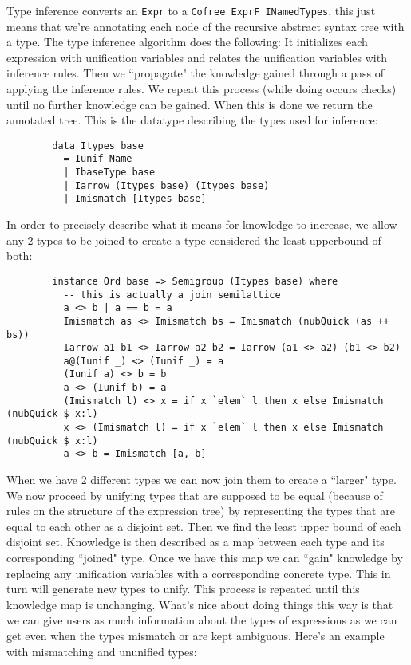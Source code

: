 \documentclass{article} %
\begin{document}
    Type inference converts an \texttt{Expr} to a \texttt{Cofree ExprF INamedTypes}, this just means that we're annotating each node of the recursive abstract syntax tree with a type. The type inference algorithm does the following: It initializes each expression with unification variables and relates the unification variables with inference rules. Then we ``propagate" the knowledge gained through a pass of applying the inference rules. We repeat this process (while doing occurs checks) until no further knowledge can be gained. When this is done we return the annotated tree. This is the datatype describing the types used for inference:
    \begin{verbatim}
        data Itypes base
          = Iunif Name
          | IbaseType base
          | Iarrow (Itypes base) (Itypes base)
          | Imismatch [Itypes base]
    \end{verbatim}
    In order to precisely describe what it means for knowledge to increase, we allow any 2 types to be joined to create a type considered the least upperbound of both:
    \begin{verbatim}
        instance Ord base => Semigroup (Itypes base) where
          -- this is actually a join semilattice
          a <> b | a == b = a
          Imismatch as <> Imismatch bs = Imismatch (nubQuick (as ++ bs))
          Iarrow a1 b1 <> Iarrow a2 b2 = Iarrow (a1 <> a2) (b1 <> b2)
          a@(Iunif _) <> (Iunif _) = a
          (Iunif a) <> b = b
          a <> (Iunif b) = a
          (Imismatch l) <> x = if x `elem` l then x else Imismatch (nubQuick $ x:l)
          x <> (Imismatch l) = if x `elem` l then x else Imismatch (nubQuick $ x:l)
          a <> b = Imismatch [a, b]
    \end{verbatim}
    When we have 2 different types we can now join them to create a ``larger" type. We now proceed by unifying types that are supposed to be equal (because of rules on the structure of the expression tree) by representing the types that are equal to each other as a disjoint set. Then we find the least upper bound of each disjoint set. Knowledge is then described as a map between each type and its corresponding ``joined" type. Once we have this map we can ``gain" knowledge by replacing any unification variables with a corresponding concrete type. This in turn will generate new types to unify. This process is repeated until this knowledge map is unchanging. What's nice about doing things this way is that we can give users as much information about the types of expressions as we can get even when the types mismatch or are kept ambiguous. Here's an example with mismatching and ununified types:
\end{document}
